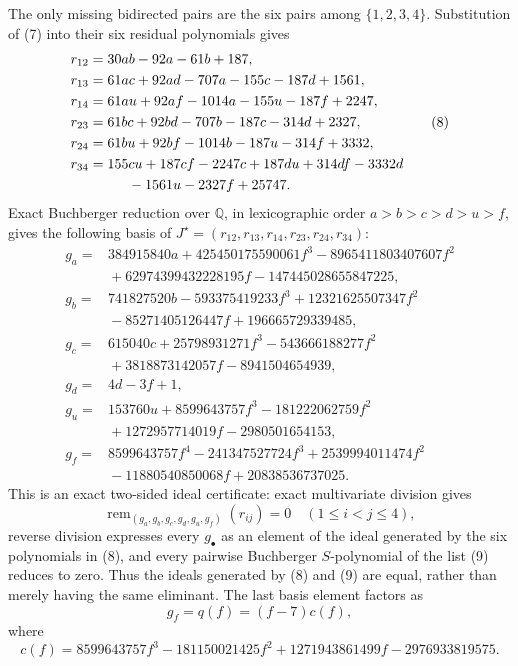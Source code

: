 The only missing bidirected pairs are the six pairs among \(\{1,2,3,4\}\). Substitution of (7) into their six residual polynomials gives
\[
\begin{aligned}
 r_{12}&=30ab-92a-61b+187,\\
 r_{13}&=61ac+92ad-707a-155c-187d+1561,\\
 r_{14}&=61au+92af-1014a-155u-187f+2247,\\
 r_{23}&=61bc+92bd-707b-187c-314d+2327,\\
 r_{24}&=61bu+92bf-1014b-187u-314f+3332,\\
 r_{34}&=155cu+187cf-2247c+187du+314df-3332d\\
 &\hspace{2.8em}{}-1561u-2327f+25747.
\end{aligned}
 \tag{8}
\]
Exact Buchberger reduction over \(\mathbb Q\), in lexicographic order \(a>b>c>d>u>f\), gives the following basis of \(J^{\star}=(r_{12},r_{13},r_{14},r_{23},r_{24},r_{34})\):
\[
\begin{aligned}
 g_a={}&384915840a+425450175590061f^3-8965411803407607f^2\\
 &{}+62974399432228195f-147445028655847225,\\
 g_b={}&741827520b-593375419233f^3+12321625507347f^2\\
 &{}-85271405126447f+196665729339485,\\
 g_c={}&615040c+25798931271f^3-543666188277f^2\\
 &{}+3818873142057f-8941504654939,\\
 g_d={}&4d-3f+1,\\
 g_u={}&153760u+8599643757f^3-181222062759f^2\\
 &{}+1272957714019f-2980501654153,\\
 g_f={}&8599643757f^4-241347527724f^3+2539994011474f^2\\
 &{}-11880540850068f+20838536737025.
\end{aligned}
 \tag{9}
\]
This is an exact two-sided ideal certificate: exact multivariate division gives
\[
 \operatorname{rem}_{(g_a,g_b,g_c,g_d,g_u,g_f)}(r_{ij})=0
 \quad(1\leq i<j\leq4),
 \tag{10}
\]
reverse division expresses every \(g_{\bullet}\) as an element of the ideal generated by the six polynomials in (8), and every pairwise Buchberger \(S\)-polynomial of the list (9) reduces to zero. Thus the ideals generated by (8) and (9) are equal, rather than merely having the same eliminant. The last basis element factors as
\[
 g_f=q(f)=(f-7)c(f),
\]
where
\[
 c(f)=8599643757f^3-181150021425f^2
       +1271943861499f-2976933819575.
\]
